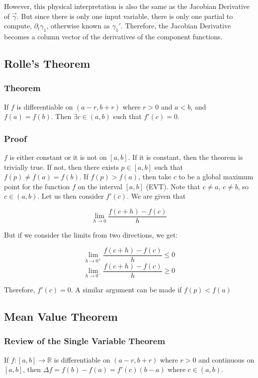 \documentclass[11 pt, twoside]{article}
\begin{document}
However, this physical interpretation is also the same as the Jacobian
Derivative of $\vec{\gamma}$. But since there is only one input variable, there
is only one partial to compute, $\partial_t \gamma_1$, otherwise known as
$\gamma_1'$. Therefore, the Jacobian Derivative becomes a column vector of the
derivatives of the component functions.

\subsection{Rolle's Theorem}
\subsubsection{Theorem}
If $f$ is differentiable on $(a - r, b + r)$ where $r > 0$ and $a < b$, and
$f(a) = f(b)$. Then $\exists  c \in (a, b)$ such that $f'(c) = 0$.

\subsubsection{Proof}

$f$ is either constant or it is not on $[a, b]$. If it is constant, then the
theorem is trivially true. If not, then there exists $p \in [a,b]$ such that
$f(p) \neq f(a) = f(b)$. If $f(p) > f(a)$, then take $c$ to be a global maximum
point for the function $f$ on the interval $[a, b]$ (EVT). Note that $c \neq a$,
$c \neq b$, so $c \in (a, b)$. Let us then consider $f'(c)$. We are given that

$$\lim_{h \to 0} \frac{f(c + h) - f(c)}{h}$$

But if we consider the limits from two directions, we get:

$$\lim_{h \to 0^+} \frac{f(c + h) - f(c)}{h} \leq 0$$
$$\lim_{h \to 0^-} \frac{f(c + h) - f(c)}{h} \geq 0$$

Therefore, $f'(c) = 0$. A similar argument can be made if $f(p) < f(a)$

\subsection{Mean Value Theorem}
\subsubsection{Review of the Single Variable Theorem}
If $f : [a, b] \to \mathbb{R}$ is differentiable on $(a - r, b + r)$ where $r
> 0$ and continuous
on $[a, b]$, then $\Delta f = f(b) - f(a) = f'(c)(b - a)$ where $c \in (a, b)$.
\end{document}
